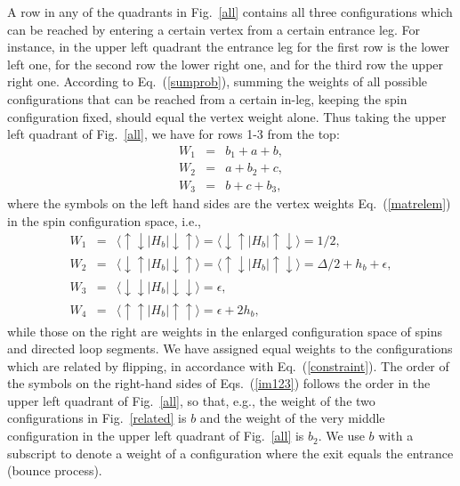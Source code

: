 \documentclass[10pt,pre,aps,twocolumn,showpacs,superscriptaddress,
floatfix]{revtex4}
\newcommand{\bea}{\begin{eqnarray}}
\newcommand{\eea}{\end{eqnarray}}
\begin{document}
A row in any of the quadrants in Fig.~\ref{all} contains all three
configurations which can be reached by entering a certain vertex 
from a certain entrance leg. For instance, in the upper left quadrant the 
entrance leg for the first row is the lower left one, for the second row
the lower right one, and for the third row the upper right one. According to
Eq.~(\ref{sumprob}), summing the weights of all possible 
configurations that can be reached from a certain in-leg, keeping the 
spin configuration fixed, should equal the vertex weight alone. Thus taking 
the upper left quadrant of Fig.~\ref{all}, we have for rows 1-3 from the top:
\bea 
	W_1 & = & b_1 + a   + b, \label{detbal1} \nonumber \\
	W_2 & = & a   + b_2 + c, \label{detbal2} \label{im123} \\
	W_3 & = & b   + c + b_3, \label{detbal3} \nonumber
\eea
where the symbols on the left hand sides are the vertex weights 
Eq.~(\ref{matrelem}) in the spin configuration space, i.e.,
\bea
W_1 &=& \langle \uparrow \downarrow | H_b | \downarrow \uparrow \rangle = 
\langle \downarrow \uparrow | H_b | \uparrow \downarrow \rangle = 1/2,
\nonumber \\
W_2 &=& \langle \downarrow \uparrow | H_b | \downarrow \uparrow \rangle =
\langle \uparrow \downarrow | H_b | \uparrow \downarrow \rangle =
\Delta /2 + h_b + \epsilon,  \nonumber  \\
W_3 &=& \langle \downarrow \downarrow | H_b | \downarrow \downarrow \rangle =
\epsilon, \label{w1234} \\
W_4 &=& \langle \uparrow \uparrow | H_b | \uparrow \uparrow \rangle =
\epsilon + 2h_b ,  \nonumber  
\eea
while those on the right are weights in the enlarged 
configuration space of spins and directed loop segments. We have assigned 
equal weights to the configurations which are related by flipping, in 
accordance with Eq.~(\ref{constraint}). The order of the symbols on the 
right-hand sides of Eqs.~(\ref{im123}) follows the order in the upper left 
quadrant of Fig.~\ref{all}, so that, e.g., the weight of the two 
configurations in Fig.~\ref{related} is $b$ and the weight of the very 
middle configuration in the upper left quadrant of Fig.~\ref{all} is $b_2$. 
We use $b$ with a subscript to denote a weight of a configuration where 
the exit equals the entrance (bounce process).
\end{document}
